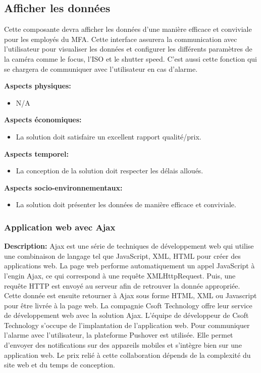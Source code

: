 \subsection{Afficher les données}
Cette composante devra afficher les données d'une manière efficace et conviviale pour les employés du MFA. Cette interface assurera la communication avec l'utilisateur pour visualiser les données et configurer les différents paramètres de la caméra comme le focus, l'ISO et le shutter speed. C'est aussi cette fonction qui se chargera de communiquer avec l'utilisateur en cas d'alarme. \vspace{5mm}

\textbf{Aspects physiques:}
\begin{itemize} [label = {--}]
    \item N/A
\end{itemize}

\textbf{Aspects économiques:}
\begin{itemize} [label = {--}]
    \item La solution doit satisfaire un excellent rapport qualité/prix.
\end{itemize}

\textbf{Aspects temporel:}
\begin{itemize} [label = {--}]
    \item La conception de la solution doit respecter les délais alloués.
\end{itemize}

\textbf{Aspects socio-environnementaux:}
\begin{itemize} [label = {--}]
    \item La solution doit présenter les données de manière efficace et conviviale.
\end{itemize}


\subsubsection{Application web avec Ajax}

\textbf{Description:} Ajax est une série de techniques de développement web qui utilise une combinaison de langage tel que JavaScript, XML, HTML pour créer des applications web. La page web performe automatiquement un appel JavaScript à l'engin Ajax, ce qui correspond à une requête XMLHttpRequest. Puis, une requête HTTP est envoyé au serveur afin de retrouver la donnée appropriée. Cette donnée est ensuite retourner à Ajax sous forme HTML, XML ou Javascript pour être livrée à la page web. La compagnie Csoft Technology offre leur service de développement web avec la solution Ajax. L'équipe de développeur de Csoft Technology s'occupe de l'implantation de l'application web. Pour communiquer l'alarme avec l'utilisateur, la plateforme Pushover est utilisée. Elle permet d'envoyer des notifications sur des appareils mobiles et s'intègre bien sur une application web. Le prix relié à cette collaboration dépends de la complexité du site web et du temps de conception.

